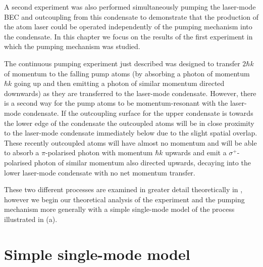A second experiment was also performed simultaneously pumping the laser-mode BEC and outcoupling from this condensate to demonstrate that the production of the atom laser could be operated independently of the pumping mechanism into the condensate.  In this chapter we focus on the results of the first experiment in which the pumping mechanism was studied.

\parasep

The continuous pumping experiment just described was designed to transfer $2 \hbar k$ of momentum to the falling pump atoms (by absorbing a photon of momentum $\hbar k$ going up and then emitting a photon of similar momentum directed downwards) as they are transferred to the laser-mode condensate.  However, there is a second way for the pump atoms to be momentum-resonant with the laser-mode condensate.  If the outcoupling surface for the upper condensate is towards the lower edge of the condensate the outcoupled atoms will be in close proximity to the laser-mode condensate immediately below due to the slight spatial overlap.  These recently outcoupled atoms will have almost no momentum and will be able to absorb a $\pi$-polarised photon with momentum $\hbar k$ upwards and emit a $\sigma^+$-polarised photon of similar momentum also directed upwards, decaying into the lower laser-mode condensate with no net momentum transfer.

These two different processes are examined in greater detail theoretically in , however we begin our theoretical analysis of the experiment and the pumping mechanism more generally with a simple single-mode model of the process illustrated in (a).


\section{Simple single-mode model}
\label{OpticalPumping:SingleModeModel}

